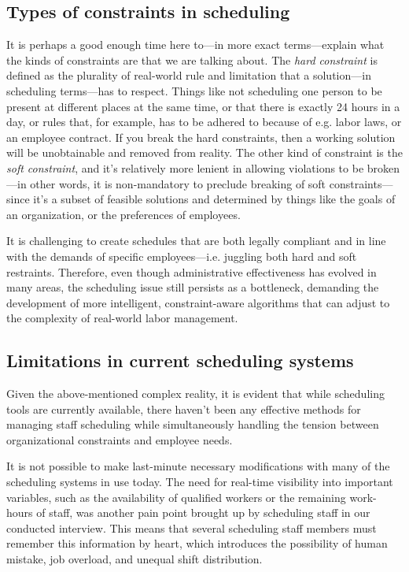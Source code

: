 \documentclass[nomenclature, english, bibtex]{kththesis}
\begin{document}
\subsection{Types of constraints in scheduling}
It is perhaps a good enough time here to—in more exact terms—explain what the kinds of constraints are that we are talking about. The \textit{hard constraint} is defined as the plurality of real-world rule and limitation that a solution—in scheduling terms—has to respect. Things like not scheduling one person to be present at different places at the same time, or that there is exactly 24 hours in a day, or rules that, for example, has to be adhered to because of e.g. labor laws, or an employee contract. If you break the hard constraints, then a working solution will be unobtainable and removed from reality. The other kind of constraint is the \textit{soft constraint}, and it's relatively more lenient in allowing violations to be broken—in other words, it is non-mandatory to preclude breaking of soft constraints—since it's a subset of feasible solutions and determined by things like the goals of an organization, or the preferences of employees. \cite{timefold_documentation_planning-ai-concepts} \cite{regin2006softalldiff}

It is challenging to create schedules that are both legally compliant and in line with the demands of specific employees—i.e. juggling both hard and soft restraints. Therefore, even though administrative effectiveness has evolved in many areas, the scheduling issue still persists as a bottleneck, demanding the development of more intelligent, constraint-aware algorithms that can adjust to the complexity of real-world labor management. \cite{ohlund2025} \cite{Otero-Caicedo2023-zf} \cite{Ngoo2022-gk}
\subsection{Limitations in current scheduling systems}
Given the above-mentioned complex reality, it is evident that while scheduling tools are currently available, there haven't been any effective methods for managing staff scheduling while simultaneously handling the tension between organizational constraints and employee needs. \cite{researchgate_article} \cite{Burgert2024-uo} \cite{Yasmine2024-gb} \cite{Thomas_2024}

It is not possible to make last-minute necessary modifications with many of the scheduling systems in use today. The need for real-time visibility into important variables, such as the availability of qualified workers or the remaining work-hours of staff, was another pain point brought up by scheduling staff in our conducted interview. This means that several scheduling staff members must remember this information by heart, which introduces the possibility of human mistake, job overload, and unequal shift distribution. \cite{Hur_researchgate} \cite{ohlund2025} \cite{Alaouchiche_researchgate}
\end{document}
